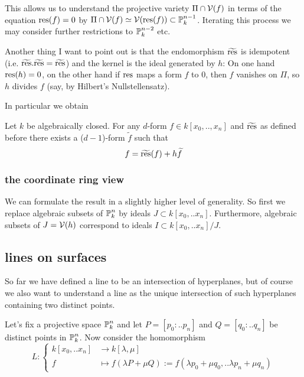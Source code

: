 This allows us to understand the projective variety $\Pi \cap \operatorname{\mathcal V}(f)$ in terms of the equation ${\operatorname{res}}(f) = 0$ by $\Pi \cap \operatorname{\mathcal V}(f) \simeq \operatorname{\mathcal V}({\operatorname{res}}(f)) \subset \operatorname{\mathbb P}^{n-1}_k$.
Iterating this process we may consider further restrictions to $\operatorname{\mathbb P}^{n-2}_k$ etc.

Another thing I want to point out is that the endomorphism $\widetilde{{\operatorname{res}}}$ is idempotent (i.e. $\widetilde{{\operatorname{res}}}.\widetilde{{\operatorname{res}}} = \widetilde{{\operatorname{res}}}$) and the kernel is the ideal generated by $h$: On one hand ${\operatorname{res}}(h) = 0$, on the other hand if ${\operatorname{res}}$ maps a form $f$ to $0$, then $f$ vanishes on $\Pi$, so $h$ divides $f$ (say, by Hilbert's Nullstellensatz).

In particular we obtain
\begin{proposition}
Let $k$ be algebraically closed.
For any $d$-form $f \in k[x_0,..,x_n]$ and $\widetilde{{\operatorname{res}}}$ as defined before there exists a ($d-1$)-form $\widetilde f$ such that
\begin{equation}
f = \widetilde{{\operatorname{res}}}(f) +  h\widetilde f
\end{equation}
\end{proposition}

\subsubsection{the coordinate ring view}



We can formulate the result in a slightly higher level of generality. So first we replace algebraic subsets of $\operatorname{\mathbb P}^n_k$ by ideals $J \subset k[x_0,..x_n]$.
Furthermore, algebraic subsets of $J = \operatorname{\mathcal V}(h)$ correspond to ideals $I \subset k[x_0,..x_n]/J$.


\subsection{lines on surfaces}


So far we have defined a line to be an intersection of hyperplanes, but of course we also want to understand a line as the unique intersection of such hyperplanes containing two distinct points.

Let's fix a projective space $\operatorname{\mathbb P}^n_k$ and let $P=[p_0:..p_n]$ and $Q=[q_0:..q_n]$ be distinct points in $\operatorname{\mathbb P}^n_k$. Now consider the homomorphism
\begin{equation}
L : \begin{cases}
k[x_0,..x_n] &\to k[\lambda,\mu] \\
f &\mapsto f(\lambda P + \mu Q) := f(\lambda p_0 + \mu q_0, .. \lambda p_n + \mu q_n)
\end{cases}
\end{equation}

